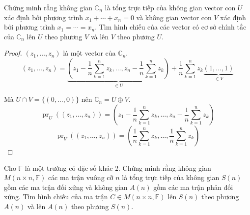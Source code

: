 \begin{exercise}
    Chứng minh rằng không gian $\mathbb{C}_{n}$ là tổng trực tiếp của không gian vector con $U$ xác định bởi phương trình $x_{1} + \cdots + x_{n} = 0$ và không gian vector con $V$ xác định bởi phương trình $x_{1} = \cdots = x_{n}$. Tìm hình chiếu của các vector có cơ sở chính tắc của $\mathbb{C}_{n}$ lên $U$ theo phương $V$ và lên $V$ theo phương $U$.
\end{exercise}

\begin{proof}
    $(z_{1}, \ldots, z_{n})$ là một vector của $\mathbb{C}_{n}$.
    \[
        (z_{1}, \ldots, z_{n}) = \underbrace{\left(z_{1} - \frac{1}{n}\sum^{n}_{k=1}z_{k}, \ldots, z_{n} - \frac{1}{n}\sum^{n}_{k=1}z_{k}\right)}_{\in U} + \frac{1}{n}\sum^{n}_{k=1}z_{k}\underbrace{(1,\ldots, 1)}_{\in V}
    \]
    
    Mà $U\cap V = \{ (0,\ldots, 0) \}$ nên $\mathbb{C}_{n} = U\oplus V$.
    \[ \operatorname{pr}_{U}((z_{1}, \ldots, z_{n})) = \left(z_{1} - \frac{1}{n}\sum^{n}_{k=1}z_{k}, \ldots, z_{n} - \frac{1}{n}\sum^{n}_{k=1}z_{k}\right) \]
    \[ \operatorname{pr}_{V}((z_{1}, \ldots, z_{n})) = \left(\frac{1}{n}\sum^{n}_{k=1}z_{k}, \ldots, \frac{1}{n}\sum^{n}_{k=1}z_{k}\right) \]
\end{proof}

\begin{exercise}
    Cho $\mathbb{F}$ là một trường có đặc số khác $2$. Chứng minh rằng không gian $M(n\times n, \mathbb{F})$ các ma trận vuông cỡ $n$ là tổng trực tiếp của không gian $S(n)$ gồm các ma trận đối xứng và không gian $A(n)$ gồm các ma trận phản đối xứng. Tìm hình chiếu của ma trận $C\in M(n\times n, \mathbb{F})$ lên $S(n)$ theo phương $A(n)$ và lên $A(n)$ theo phương $S(n)$.
\end{exercise}

